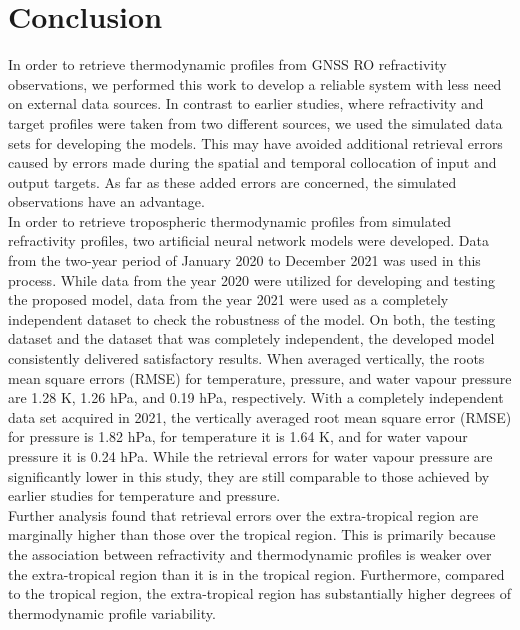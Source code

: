 \documentclass[a4paper,12pt,twoside]{article}
\begin{document}
\section{Conclusion}

\noindent In order to retrieve thermodynamic profiles from GNSS RO refractivity observations, we performed
this work to develop a reliable system with less need on external data sources. In contrast to earlier
studies, where refractivity and target profiles were taken from two different sources, we used the
simulated data sets for developing the models. This may have avoided additional retrieval errors
caused by errors made during the spatial and temporal collocation of input and output targets. As
far as these added errors are concerned, the simulated observations have an advantage. \\

\noindent In order to retrieve tropospheric thermodynamic profiles from simulated refractivity profiles, two
artificial neural network models were developed. Data from the two-year period of January 2020 to
December 2021 was used in this process. While data from the year 2020 were utilized for developing
and testing the proposed model, data from the year 2021 were used as a completely independent
dataset to check the robustness of the model. On both, the testing dataset and the dataset that was
completely independent, the developed model consistently delivered satisfactory results. When
averaged vertically, the roots mean square errors (RMSE) for temperature, pressure, and water
vapour pressure are 1.28 K, 1.26 hPa, and 0.19 hPa, respectively. With a completely independent
data set acquired in 2021, the vertically averaged root mean square error (RMSE) for pressure is 1.82
hPa, for temperature it is 1.64 K, and for water vapour pressure it is 0.24 hPa. While the retrieval
errors for water vapour pressure are significantly lower in this study, they are still comparable to those achieved by earlier studies for temperature and pressure. \\

\noindent Further analysis found that retrieval errors over the extra-tropical region are marginally higher than
those over the tropical region. This is primarily because the association between refractivity and
thermodynamic profiles is weaker over the extra-tropical region than it is in the tropical region.
Furthermore, compared to the tropical region, the extra-tropical region has substantially higher
degrees of thermodynamic profile variability. \\
\end{document}
